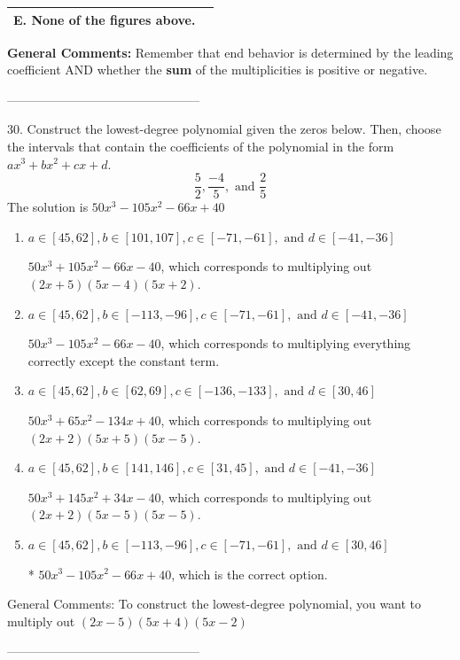 \documentclass{article}[14pt]
\begin{document}
\begin{tabular}{|c|c|}
\hline 
 E. None of the figures above. & \tabularnewline 
\hline 
 \end{tabular} 
 
\textbf{General Comments:} Remember that end behavior is determined by the leading coefficient AND whether the \textbf{sum} of the multiplicities is positive or negative.

-----------------------------------------------

30. Construct the lowest-degree polynomial given the zeros below. Then, choose the intervals that contain the coefficients of the polynomial in the form $ax^3+bx^2+cx+d$.
$$ \frac{5}{2}, \frac{-4}{5}, \text{ and } \frac{2}{5} $$ 
The solution is $ 50x^{3} -105 x^{2} -66 x + 40 $ 

\begin{enumerate}[label=\Alph*.] 
\item $ a \in [45, 62], b \in [101, 107], c \in [-71, -61], \text{ and } d \in [-41, -36] $ 

 $50x^{3} +105 x^{2} -66 x -40$, which corresponds to multiplying out $(2x + 5)(5x -4)(5x + 2)$. 
\item $ a \in [45, 62], b \in [-113, -96], c \in [-71, -61], \text{ and } d \in [-41, -36] $ 

 $50x^{3} -105 x^{2} -66 x -40$, which corresponds to multiplying everything correctly except the constant term. 
\item $ a \in [45, 62], b \in [62, 69], c \in [-136, -133], \text{ and } d \in [30, 46] $ 

 $50x^{3} +65 x^{2} -134 x + 40$, which corresponds to multiplying out $(2x + 2)(5x + 5)(5x -5)$. 
\item $ a \in [45, 62], b \in [141, 146], c \in [31, 45], \text{ and } d \in [-41, -36] $ 

 $50x^{3} +145 x^{2} +34 x -40$, which corresponds to multiplying out $(2x + 2)(5x -5)(5x -5)$. 
\item $ a \in [45, 62], b \in [-113, -96], c \in [-71, -61], \text{ and } d \in [30, 46] $ 

 * $50x^{3} -105 x^{2} -66 x + 40$, which is the correct option. 
\end{enumerate} 
 
General Comments: To construct the lowest-degree polynomial, you want to multiply out $(2x -5)(5x + 4)(5x -2)$

-----------------------------------------------
\end{document}
